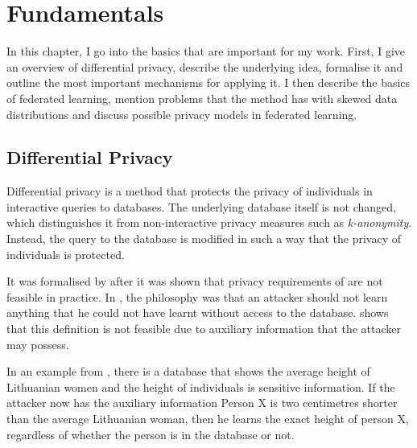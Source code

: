 \chapter{Fundamentals}\label{chap:fundamentals}

In this chapter, I go into the basics that are important for my work. First, I give an overview of differential privacy, describe the underlying idea, formalise it and outline the most important mechanisms for applying it. I then describe the basics of federated learning, mention problems that the method has with skewed data distributions and discuss possible privacy models in federated learning.

\section{Differential Privacy}


Differential privacy is a method that protects the privacy of individuals in interactive queries to databases. The underlying database itself is not changed, which distinguishes it from non-interactive privacy measures such as \textit{k-anonymity}. Instead, the query to the database is modified in such a way that the privacy of individuals is protected. 

It was formalised by \textcite{dwork:2006} after it was shown that privacy requirements of \textcite{dalenius:1977} are not feasible in practice. In \citeauthor{dalenius:1977}, the philosophy was that an attacker should not learn anything that he could not have learnt without access to the database. \citeauthor{dwork:2006} shows that this definition is not feasible due to auxiliary information that the attacker may possess. 

In an example from \citeauthor{dwork:2006}, there is a database that shows the average height of Lithuanian women and the height of individuals is sensitive information. If the attacker now has the auxiliary information \glqq{}Person X is two centimetres shorter than the average Lithuanian woman\grqq{}, then he learns the exact height of person X, regardless of whether the person is in the database or not. 

